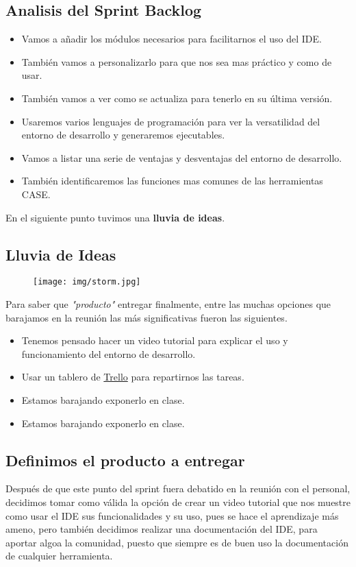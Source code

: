 \documentclass{article}
\begin{document}
        \subsection{Analisis del Sprint Backlog}
        \begin{itemize}
          \item Vamos a añadir los módulos necesarios para facilitarnos el uso del IDE.
          \item También vamos a personalizarlo para que nos sea mas práctico y como de usar.
          \item También vamos a ver como se actualiza para tenerlo en su última versión.
          \item Usaremos varios lenguajes de programación para ver la versatilidad del entorno de desarrollo y generaremos ejecutables.
          \item Vamos a listar una serie de ventajas y desventajas del entorno de desarrollo.
          \item También identificaremos las funciones mas comunes de las herramientas CASE.
        \end{itemize}
        
        En el siguiente punto tuvimos una \textbf{lluvia de ideas}.
        
        \subsection{Lluvia de Ideas}
          \begin{figure}[h]
            \centering
            \texttt{[image: img/storm.jpg]}
          \end{figure}
          Para saber que \textit{"producto"} entregar finalmente, entre las muchas opciones que barajamos en la reunión las más significativas 
          fueron las siguientes.
          \begin{itemize}
            \item Tenemos pensado hacer un video tutorial para explicar el uso y funcionamiento del entorno de desarrollo.
            \item Usar un tablero de \href{https://trello.com}{Trello} para repartirnos las tareas.
            \item Estamos barajando exponerlo en clase.
            \item Estamos barajando exponerlo en clase.
          \end{itemize}

        \subsection{Definimos el producto a entregar}
           Después de que este punto del sprint fuera debatido en la reunión con el personal, decidimos tomar como válida la opción de crear un video tutorial que nos muestre como usar el IDE 
           sus funcionalidades y su uso, pues se hace el aprendizaje más ameno, pero también decidimos realizar una documentación del IDE, para aportar algoa la comunidad, puesto que siempre 
           es de buen uso la documentación de cualquier herramienta.
\end{document}
